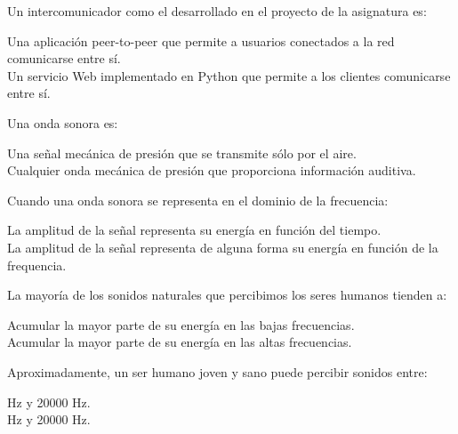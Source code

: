 \documentclass[legalpaper, 12pt, addpoints]{exam}
\begin{document}
\begin{questions}

\question Un intercomunicador como el desarrollado en el proyecto de la asignatura es:

\begin{oneparchoices}
  \choice Una aplicación peer-to-peer que permite a usuarios conectados a la red comunicarse entre sí.\\
  \choice Un servicio Web implementado en Python que permite a los clientes comunicarse entre sí.
\end{oneparchoices}
  
\vspace{0.10in}

\question Una onda sonora es:

\begin{oneparchoices}
  \choice Una señal mecánica de presión que se transmite sólo por el aire.\\
  \choice Cualquier onda mecánica de presión que proporciona información auditiva.
\end{oneparchoices}
  
\question Cuando una onda sonora se representa en el dominio de la frecuencia:

\begin{oneparchoices}
  \choice La amplitud de la señal representa su energía en función del tiempo.\\
  \choice La amplitud de la señal representa de alguna forma su energía en función de la frequencia.
\end{oneparchoices}
  
\vspace{0.10in}

\question La mayoría de los sonidos naturales que percibimos los seres humanos tienden a:

\begin{oneparchoices}
  \choice Acumular la mayor parte de su energía en las bajas frecuencias.\\
  \choice Acumular la mayor parte de su energía en las altas frecuencias.
\end{oneparchoices}
  
\vspace{0.10in}

\question Aproximadamente, un ser humano joven y sano puede percibir sonidos entre:

\begin{oneparchoices}
   Hz y 20000 Hz.\\
   Hz y 20000 Hz.
\end{oneparchoices}
  

\end{questions}
\end{document}
